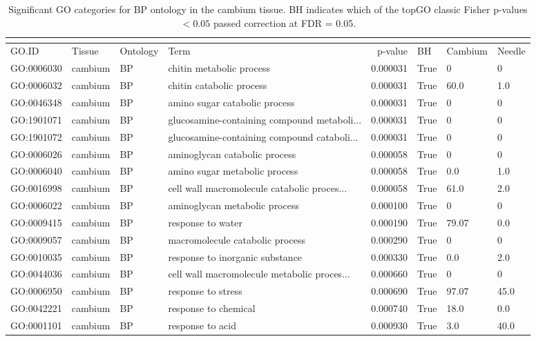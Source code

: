 \begin{longtable}{llllrl}
\caption{Significant GO categories for BP ontology in the cambium tissue. BH indicates which of the topGO classic Fisher p-values $< 0.05$ passed correction at FDR = 0.05.}\\
\label{tab:go-cambium-BP}\\
\toprule
GO.ID & Tissue & Ontology & Term & p-value & BH & Cambium & Needle \\
\midrule
GO:0006030 & cambium & BP &   chitin metabolic process  & 0.000031 &   True  & 0 & 0 \\
GO:0006032 & cambium & BP &   chitin catabolic process  & 0.000031 &   True  & 60.0 & 1.0 \\ 
GO:0046348 & cambium & BP &   amino sugar catabolic process  & 0.000031 &   True  & 0 & 0 \\
GO:1901071 & cambium & BP &   glucosamine-containing compound metaboli...  & 0.000031 &   True  & 0 & 0 \\
GO:1901072 & cambium & BP &   glucosamine-containing compound cataboli...  & 0.000031 &   True  & 0 & 0 \\
GO:0006026 & cambium & BP &   aminoglycan catabolic process  & 0.000058 &   True  & 0 & 0 \\
GO:0006040 & cambium & BP &   amino sugar metabolic process  & 0.000058 &   True  & 0.0 & 1.0 \\ 
GO:0016998 & cambium & BP &   cell wall macromolecule catabolic proces...  & 0.000058 &   True  & 61.0 & 2.0 \\ 
GO:0006022 & cambium & BP &   aminoglycan metabolic process  & 0.000100 &   True  & 0 & 0 \\
GO:0009415 & cambium & BP &   response to water  & 0.000190 &   True  & 79.07 & 0.0 \\ 
GO:0009057 & cambium & BP &   macromolecule catabolic process  & 0.000290 &   True  & 0 & 0 \\
GO:0010035 & cambium & BP &   response to inorganic substance  & 0.000330 &   True  & 0.0 & 2.0 \\ 
GO:0044036 & cambium & BP &   cell wall macromolecule metabolic proces...  & 0.000660 &   True  & 0 & 0 \\
GO:0006950 & cambium & BP &   response to stress  & 0.000690 &   True  & 97.07 & 45.0 \\ 
GO:0042221 & cambium & BP &   response to chemical  & 0.000740 &   True  & 18.0 & 0.0 \\ 
GO:0001101 & cambium & BP &   response to acid  & 0.000930 &   True  & 3.0 & 40.0 \\ 

\end{longtable}
